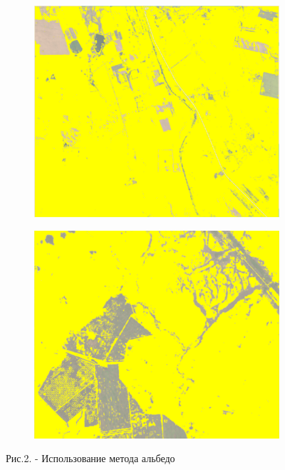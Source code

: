 \begin{figure}[H]
   \centering
   \begin{subfigure}{0.45\textwidth}
   	\centering
   	\includegraphics[width=\textwidth,height=0.75\textwidth]{media/ict/image33}
   \end{subfigure}
   \begin{subfigure}{0.45\textwidth}
   	\centering
   	\includegraphics[width=\textwidth,height=0.75\textwidth]{media/ict/image34}
   \end{subfigure}
   \caption*{Рис.2. - Использование метода альбедо}
\end{figure}

